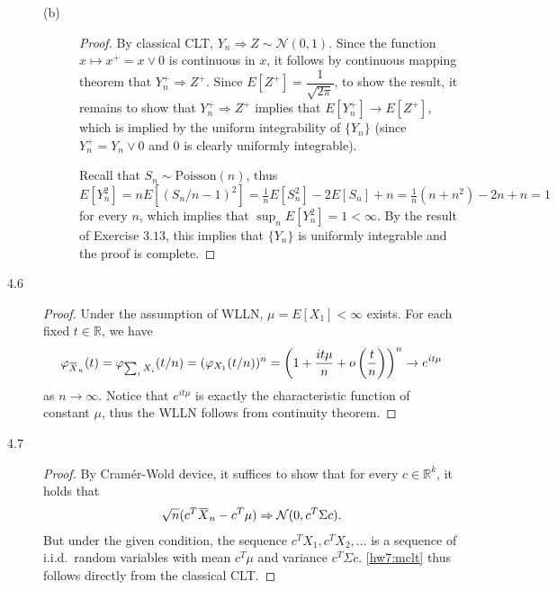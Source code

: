\documentclass{article}
\newcommand{\eps}{\varepsilon}
\newcommand{\real}{\mathbb{R}}
\newcommand{\overbar}[1]{\mkern 1.5mu\overline{\mkern-1.5mu#1\mkern-1.5mu}\mkern 1.5mu}
\DeclareMathOperator*{\Var}{Var}
\theoremstyle{definition}
\theoremstyle{plain}
\theoremstyle{remark}
\begin{document}
\begin{description}
\begin{description}
\item[(b)]
\begin{proof}
By classical CLT, $Y_n \Rightarrow Z \sim \mathcal{N}(0, 1)$. Since the function $x \mapsto x^+ = x \vee 0$ is continuous in $x$, it follows by continuous mapping theorem that $Y_n^+ \Rightarrow Z^+$. Since $E[Z^+] = \dfrac{1}{\sqrt{2\pi}}$, to show the result, it remains to show that $Y_n^+ \Rightarrow Z^+$ implies that $E[Y_n^+] \to E[Z^+]$, which is implied by the uniform integrability of $\{Y_n\}$ (since $Y_n^+ = Y_n \vee 0$ and $0$ is clearly
uniformly integrable).

Recall that $S_n \sim \text{Poisson}(n)$, thus $E[Y_n^2] = nE[(S_n/n - 1)^2] = \frac{1}{n}E[S_n^2] - 2E[S_n] + n = \frac{1}{n}(n + n^2) - 2n + n = 1$ for every $n$, which implies that $\sup_n E[Y_n^2] = 1 < \infty$. By the result of Exercise $3.13$, this implies that $\{Y_n\}$ is uniformly integrable and the proof is complete.
\end{proof}
\end{description}

\item[4.6]
\begin{proof}
Under the assumption of WLLN, $\mu = E[X_1] < \infty$ exists. For each fixed $t \in \real$, we have
\begin{align*}
\varphi_{\overbar{X}_n}(t) = \varphi_{\sum_i X_i}(t/n) = (\varphi_{X_1}(t/n))^n = \left(1 + \frac{it\mu}{n} + o\left(\frac{t}{n}\right)\right)^n \to e^{it\mu}
\end{align*}
as $n \to \infty$. Notice that $e^{it\mu}$ is exactly the characteristic function of constant $\mu$, thus the WLLN follows from continuity theorem.
\end{proof}

\item[4.7]
\begin{proof}
By Cram\'{e}r-Wold device, it suffices to show that for every $c \in \real^k$, it holds that
\begin{align}\label{hw7:mclt}
\sqrt{n}(c^T \overbar{X}_n - c^T \mu) \Rightarrow \mathcal{N}(0, c^T \Sigma c).
\end{align}
But under the given condition, the sequence $c^T X_1, c^T X_2, \ldots$ is a sequence of i.i.d.\ random variables with mean $c^T\mu$ and variance $c^T\Sigma c$. \eqref{hw7:mclt} thus follows directly from the classical CLT.
\end{proof}

\begin{comment}
\item[4.11]
\begin{proof}
Let $Y_{ni}$ be defined as in Exercise $4.13$. Since $\max\limits_{1 \leq i \leq n}\Var(Y_{ni})/s_n^2 = \frac{p_n(1 - p_n)}{np_n(1 - p_n)} = 1/n \to 0$ as $n \to \infty$, by Lindeberg-Feller CLT, $(X_n - np_n)/s_n \Rightarrow \mathcal{N}(0, 1)$ implies that Lindeberg's condition must hold, that is, for every $\eps > 0$, 
\begin{align}\label{hw7:feller}
\frac{1}{np_n(1 - p_n)} \sum_{i = 1}^n E\left\{Y_{ni}^2 I[|Y_{ni}| \geq \eps \sqrt{np_n(1 - p_n)}]\right\} \to 0
\end{align}
as $n \to \infty$.


\end{comment}
\end{description}
\end{document}
